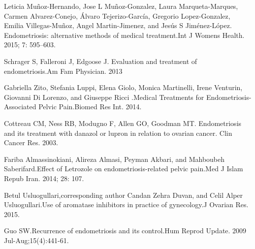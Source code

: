 \documentclass[12pt]{article} %
\begin{document}
Leticia Muñoz-Hernando, Jose L Muñoz-Gonzalez, Laura Marqueta-Marques, Carmen Alvarez-Conejo, Álvaro Tejerizo-García, Gregorio Lopez-Gonzalez, Emilia Villegas-Muñoz, Angel Martin-Jimenez, and Jesús S Jiménez-López. Endometriosis: alternative methods of medical treatment.Int J Womens Health. 2015; 7: 595–603. 

Schrager S, Falleroni J, Edgoose J. Evaluation and treatment of endometriosis.Am Fam Physician. 2013

Gabriella Zito, Stefania Luppi, Elena Giolo, Monica Martinelli, Irene Venturin, Giovanni Di Lorenzo, and Giuseppe Ricci .Medical Treatments for Endometriosis-Associated Pelvic Pain.Biomed Res Int. 2014.

Cottreau CM, Ness RB, Modugno F, Allen GO, Goodman MT. Endometriosis and its treatment with danazol or lupron in relation to ovarian cancer. Clin Cancer Res. 2003.

Fariba Almassinokiani, Alireza Almasi, Peyman Akbari, and Mahboubeh Saberifard.Effect of Letrozole on endometriosis-related pelvic pain.Med J Islam Repub Iran. 2014; 28: 107. 

Betul Usluogullari,corresponding author Candan Zehra Duvan, and Celil Alper Usluogullari.Use of aromatase inhibitors in practice of gynecology.J Ovarian Res. 2015.

Guo SW.Recurrence of endometriosis and its control.Hum Reprod Update. 2009 Jul-Aug;15(4):441-61.
\end{document}
